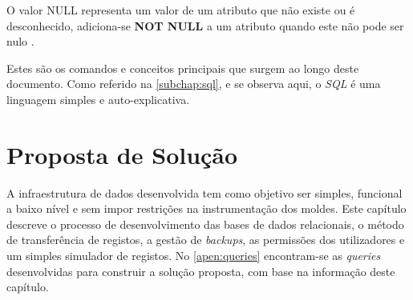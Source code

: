 \documentclass[11pt,twoside,a4paper]{report}
\begin{document}
O valor NULL representa um valor de um atributo que não existe ou é desconhecido, adiciona-se \textbf{NOT NULL} a um atributo quando este não pode ser nulo \cite{mysql}.\par 
Estes são os comandos e conceitos principais que surgem ao longo deste documento. Como referido na \autoref{subchap:sql}, e se observa aqui, o \textit{SQL} é uma linguagem simples e auto-explicativa.

\cleardoublepage
\chapter{Proposta de Solução}
\label{chap:solucao}
A infraestrutura de dados desenvolvida tem como objetivo ser simples, funcional a baixo nível e sem impor restrições na instrumentação dos moldes. Este capítulo descreve o processo de desenvolvimento das bases de dados relacionais, o método de transferência de registos, a gestão de \textit{backups}, as permissões dos utilizadores e um simples simulador de registos. No \autoref{apen:queries} encontram-se as \textit{queries} desenvolvidas para construir a solução proposta, com base na informação deste capítulo.
\end{document}

